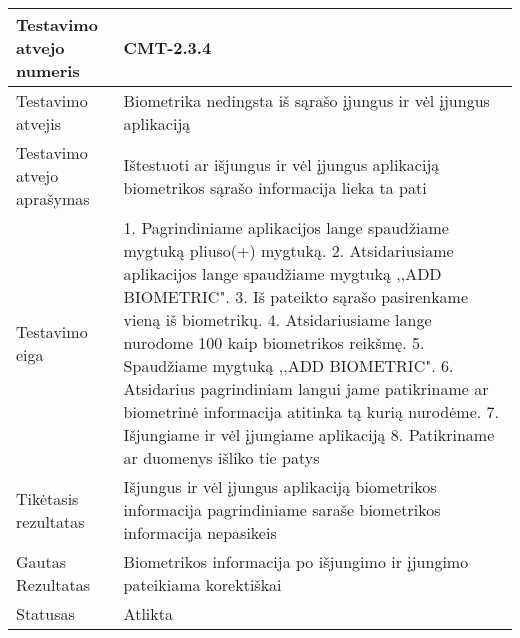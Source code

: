 \documentclass[oneside]{VUMIFPSkursinis}
\begin{document}
\begin{center}
    \begin{tabular}{ |p{5cm}|p{13cm}|}
    \hline
        Testavimo atvejo numeris & CMT-2.3.4  \\ \hline
        Testavimo atvejis & Biometrika nedingsta iš sąrašo įjungus ir vėl įjungus aplikaciją  \\ \hline
        Testavimo atvejo aprašymas & Ištestuoti ar išjungus ir vėl įjungus aplikaciją biometrikos sąrašo informacija lieka ta pati  \\ \hline
        Testavimo eiga &  1. Pagrindiniame aplikacijos lange spaudžiame mygtuką pliuso(+) mygtuką. 
				2. Atsidariusiame aplikacijos lange spaudžiame mygtuką ,,ADD BIOMETRIC". 
				3. Iš pateikto sąrašo pasirenkame vieną iš biometrikų. 
				4. Atsidariusiame lange nurodome 100 kaip biometrikos reikšmę.
				5. Spaudžiame mygtuką ,,ADD BIOMETRIC".
				6. Atsidarius pagrindiniam langui jame patikriname ar biometrinė informacija atitinka tą kurią nurodėme.
				7. Išjungiame ir vėl įjungiame aplikaciją
				8. Patikriname ar duomenys išliko tie patys\\ \hline
        Tikėtasis rezultatas &  Išjungus ir vėl įjungus aplikaciją biometrikos informacija pagrindiniame saraše biometrikos informacija nepasikeis\\ \hline
        Gautas Rezultatas & Biometrikos informacija po išjungimo ir įjungimo pateikiama korektiškai  \\ \hline
        Statusas & Atlikta  \\ \hline
    \hline
    \end{tabular}
\end{center}
\end{document}
